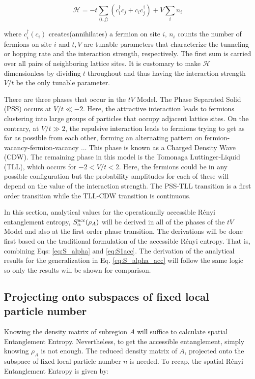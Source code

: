 \begin{equation}
\mathcal{H} = -t \sum_{\langle i,j \rangle} (c_{i}^{\dag}c_{j} + c_{i}c_{j}^{\dag}) + V \sum_{i} n_{i}
\label{eq:tVModel}
\end{equation}

where $c^{\dag}_i(c_{i})$ creates(annihilates) a fermion on site $i$, $n_i$ counts the number of fermions on site $i$ and $t,V$ are tunable parameters that characterize the tunneling or hopping rate and the interaction strength, respectively. The first sum is carried over all pairs of neighboring lattice sites. It is customary to make $\mathcal{H}$ dimensionless by dividing $t$ throughout and thus having the interaction strength $V/t$ be the only tunable parameter.

There are three phases that occur in the $tV$ Model. The Phase Separated Solid (PSS) occurs at $V/t \ll -2$. Here, the attractive interaction leads to fermions clustering into large groups of particles that occupy adjacent lattice sites. On the contrary, at $V/t \gg 2$, the repulsive interaction leads to fermions trying to get as far as possible from each other, forming an alternating pattern on fermion-vacancy-fermion-vacancy $\dots$ This phase is known as a Charged Density Wave (CDW). The remaining phase in this model is the Tomonaga Luttinger-Liquid (TLL), which occurs for $-2 < V/t < 2$. Here, the fermions could be in any possible configuration but the probability amplitudes for each of these will depend on the value of the interaction strength. The PSS-TLL transition is a first order transition while the TLL-CDW transition is continuous.

In this section, analytical values for the operationally accessible R\'enyi entanglement entropy, $S_{\alpha}^{\rm acc}(\rho_A)$ will be derived in all of the phases of the $tV$ Model and also at the first order phase transition. The derivations will be done first based on the traditional formulation of the accessible R\'enyi entropy. That is, combining Eqs: \ref{eq:S_alpha} and \ref{eq:S1acc}. The derivation of the analytical results for the generalization in Eq. \ref{eq:S_alpha_acc} will follow the same logic so only the results will be shown for comparison.

	\subsection{Projecting onto subspaces of fixed local particle number}
	
	Knowing the density matrix of subregion $A$ will suffice to calculate spatial Entanglement Entropy. Nevertheless, to get the accessible entanglement, simply knowing $\rho_{A}$ is not enough. The reduced density matrix of $A$, projected onto the subspace of fixed local particle number $n$ is needed. To recap, the spatial R\'enyi Entanglement Entropy is given by:
	
